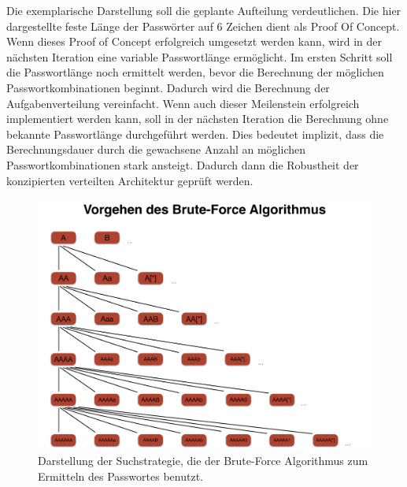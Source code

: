 Die exemplarische Darstellung soll die geplante Aufteilung verdeutlichen. Die hier dargestellte feste Länge der Passwörter auf 6 Zeichen dient als Proof Of Concept. Wenn dieses Proof of Concept erfolgreich umgesetzt werden kann, wird in der nächsten Iteration eine variable Passwortlänge ermöglicht. Im ersten Schritt soll die Passwortlänge noch ermittelt werden, bevor die Berechnung der möglichen Passwortkombinationen beginnt. Dadurch wird die Berechnung der Aufgabenverteilung vereinfacht. Wenn auch dieser Meilenstein erfolgreich implementiert werden kann, soll in der nächsten Iteration die Berechnung ohne bekannte Passwortlänge durchgeführt werden. Dies bedeutet implizit, dass die Berechnungsdauer durch die gewachsene Anzahl an möglichen Passwortkombinationen stark ansteigt. Dadurch dann die Robustheit der konzipierten verteilten Architektur geprüft werden. \\

\begin{figure}[!ht]
	\centering
		\includegraphics[natwidth=1200pt, natheight=349pt, width=1.0\textwidth]{images/SchaubildAlgorithmBreitensuche.pdf}
	\caption{Darstellung der Suchstrategie, die der Brute-Force Algorithmus zum Ermitteln des Passwortes benutzt.}
	\label{fig:showcase}
\end{figure}





